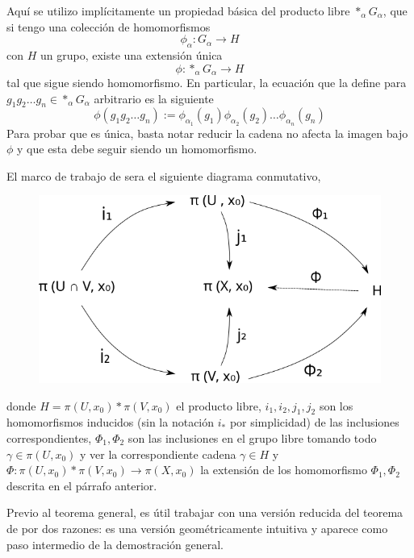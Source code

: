 Aquí se utilizo implícitamente un propiedad básica del producto libre
\(*_\alpha G_\alpha\), que si tengo una colección de homomorfismos
\[ \phi_\alpha : G_\alpha \to H \]
con \(H\) un grupo, existe una extensión única
\[ \phi : *_\alpha G_\alpha \to H \]
tal que sigue siendo homomorfismo. En particular, la ecuación que la
define para \(g_1 g_2 \dots g_n \in *_\alpha G_\alpha\) arbitrario es la siguiente
\[
  \phi \left( g_1 g_2 \dots g_n \right) := \phi_{\alpha_1} (g_1)
  \phi_{\alpha_2} (g_2) \dots \phi_{\alpha_n} (g_n)
\]
Para probar que es única, basta notar reducir la cadena no afecta la
imagen bajo \(\phi\) y que esta debe seguir siendo un homomorfismo.

El marco de trabajo de \vank sera el siguiente diagrama conmutativo,
\begin{figure}[h]
  \centering
  \includegraphics[scale=0.5]{./imagenes/van.png}
\end{figure}
donde \( H = \pi (U, x_0) * \pi (V, x_0)\) el producto libre, \(i_1,
i_2, j_1, j_2\) son los homomorfismos inducidos (sin la notación \(i_*\)
por simplicidad) de las inclusiones correspondientes, \(\Phi_1, \Phi_2\)
son las inclusiones en el grupo libre tomando todo \(\gamma \in \pi (U,
x_0)\) y ver la correspondiente cadena \(\gamma \in H\) y \(\Phi :
\pi(U, x_0) * \pi (V, x_0) \to \pi (X, x_0)\) la extensión de los
homomorfismo \(\Phi_1, \Phi_2\) descrita en el párrafo anterior.

Previo al teorema general, es útil trabajar con una versión reducida del
teorema de \vank por dos razones: es una versión geométricamente
intuitiva y aparece como paso intermedio de la demostración general.

